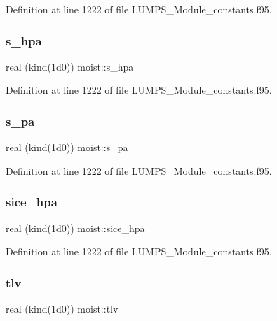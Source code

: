 Definition at line 1222 of file L\+U\+M\+P\+S\+\_\+\+Module\+\_\+constants.\+f95.

\mbox{\label{namespacemoist_ab898e28f0ece3e6a2c1852fd8fe61bc1}} 
\subsubsection{\texorpdfstring{s\+\_\+hpa}{s\_hpa}}
{\footnotesize\ttfamily real (kind(1d0)) moist\+::s\+\_\+hpa}



Definition at line 1222 of file L\+U\+M\+P\+S\+\_\+\+Module\+\_\+constants.\+f95.

\mbox{\label{namespacemoist_aa7e2596730c9a1b91e912106c46d11fe}} 
\subsubsection{\texorpdfstring{s\+\_\+pa}{s\_pa}}
{\footnotesize\ttfamily real (kind(1d0)) moist\+::s\+\_\+pa}



Definition at line 1222 of file L\+U\+M\+P\+S\+\_\+\+Module\+\_\+constants.\+f95.

\mbox{\label{namespacemoist_a38df7531f904d511b341f35b56ab56f3}} 
\subsubsection{\texorpdfstring{sice\+\_\+hpa}{sice\_hpa}}
{\footnotesize\ttfamily real (kind(1d0)) moist\+::sice\+\_\+hpa}



Definition at line 1222 of file L\+U\+M\+P\+S\+\_\+\+Module\+\_\+constants.\+f95.

\mbox{\label{namespacemoist_a4572c899e5e83d9647c7ed9f16901c24}} 
\subsubsection{\texorpdfstring{tlv}{tlv}}
{\footnotesize\ttfamily real (kind(1d0)) moist\+::tlv}



